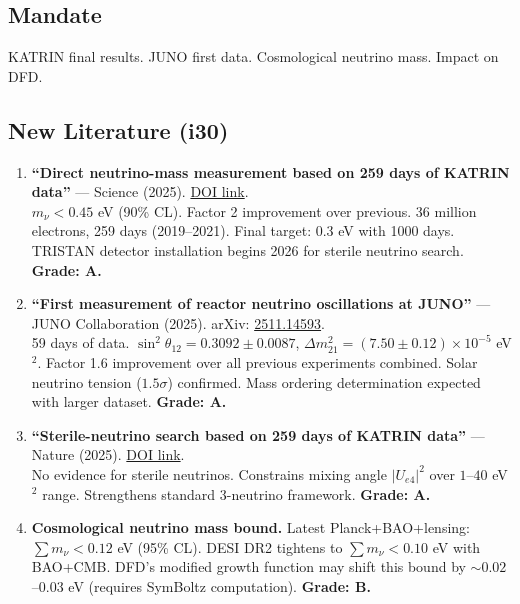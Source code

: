 \documentclass[11pt,a4paper]{article}
\begin{document}
\subsection{Mandate}
KATRIN final results. JUNO first data. Cosmological neutrino mass. Impact on DFD.

\subsection{New Literature (i30)}

\begin{enumerate}
\item \textbf{``Direct neutrino-mass measurement based on 259 days of KATRIN data''} --- Science (2025). \href{https://www.science.org/doi/10.1126/science.adq9592}{DOI link}.\\
$m_\nu < 0.45$ eV (90\% CL). Factor 2 improvement over previous. 36 million electrons, 259 days (2019--2021). Final target: 0.3 eV with 1000 days. TRISTAN detector installation begins 2026 for sterile neutrino search. \textbf{Grade: A.}

\item \textbf{``First measurement of reactor neutrino oscillations at JUNO''} --- JUNO Collaboration (2025). arXiv: \href{https://arxiv.org/abs/2511.14593}{2511.14593}.\\
59 days of data. $\sin^2\theta_{12} = 0.3092 \pm 0.0087$, $\Delta m^2_{21} = (7.50 \pm 0.12) \times 10^{-5}$ eV$^2$. Factor 1.6 improvement over all previous experiments combined. Solar neutrino tension ($1.5\sigma$) confirmed. Mass ordering determination expected with larger dataset. \textbf{Grade: A.}

\item \textbf{``Sterile-neutrino search based on 259 days of KATRIN data''} --- Nature (2025). \href{https://www.nature.com/articles/s41586-025-09739-9}{DOI link}.\\
No evidence for sterile neutrinos. Constrains mixing angle $|U_{e4}|^2$ over $1$--$40$ eV$^2$ range. Strengthens standard 3-neutrino framework. \textbf{Grade: A.}

\item \textbf{Cosmological neutrino mass bound.} Latest Planck+BAO+lensing: $\sum m_\nu < 0.12$ eV (95\% CL). DESI DR2 tightens to $\sum m_\nu < 0.10$ eV with BAO+CMB. DFD's modified growth function may shift this bound by $\sim 0.02$--$0.03$ eV (requires SymBoltz computation). \textbf{Grade: B.}
\end{enumerate}
\end{document}
